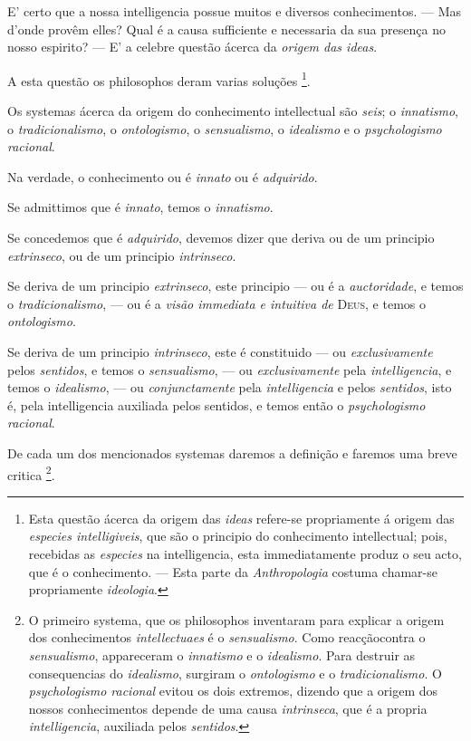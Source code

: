 
E' certo que a nossa intelligencia possue muitos e diversos conhecimentos. --- Mas d'onde provêm elles? Qual é a causa sufficiente e necessaria da sua presença no nosso espirito? --- E' a celebre questão ácerca da \emph{origem das ideas}.

A esta questão os philosophos deram varias soluções \footnote{Esta questão ácerca da origem das \emph{ideas} refere-se propriamente á origem das \emph{especies intelligiveis}, que são o principio do conhecimento intellectual; pois, recebidas as \emph{especies} na intelligencia, esta immediatamente produz o seu acto, que é o conhecimento. --- Esta parte da \emph{Anthropologia} costuma chamar-se propriamente \emph{ideologia}.}.


Os systemas ácerca da origem do conhecimento intellectual são \emph{seis}; o \emph{innatismo}, o \emph{tradicionalismo}, o \emph{ontologismo}, o \emph{sensualismo}, o \emph{idealismo} e o \emph{psychologismo racional}.

Na verdade, o conhecimento ou é \emph{innato} ou é \emph{adquirido}.

Se admittimos que é \emph{innato}, temos o \emph{innatismo}.

Se concedemos que é \emph{adquirido}, devemos dizer que deriva ou de um principio \emph{extrinseco}, ou de um principio \emph{intrinseco}.

Se deriva de um principio \emph{extrinseco}, este principio --- ou é a \emph{auctoridade}, e temos o \emph{tradicionalismo}, --- ou é a \emph{visão immediata e intuitiva de} \textsc{Deus}, e temos o \emph{ontologismo}.

Se deriva de um principio \emph{intrinseco}, este é constituido --- ou \emph{exclusivamente} pelos \emph{sentidos}, e temos o \emph{sensualismo}, --- ou \emph{exclusivamente} pela \emph{intelligencia}, e temos o \emph{idealismo}, --- ou \emph{conjunctamente} pela \emph{intelligencia} e pelos \emph{sentidos}, isto é, pela intelligencia auxiliada pelos sentidos, e temos então o \emph{psychologismo racional}.

De cada um dos mencionados systemas daremos a definição e faremos uma breve critica \footnote{O primeiro systema, que os philosophos inventaram para explicar a origem dos conhecimentos \emph{intellectuaes} é o \emph{sensualismo}. Como reacçãocontra o \emph{sensualismo}, appareceram o \emph{innatismo} e o \emph{idealismo}. Para destruir as consequencias do \emph{idealismo}, surgiram o \emph{ontologismo} e o \emph{tradicionalismo}. O \emph{psychologismo racional} evitou os dois extremos, dizendo que a origem dos nossos conhecimentos depende de uma causa \emph{intrinseca}, que é a propria \emph{intelligencia}, auxiliada pelos \emph{sentidos}.}.


